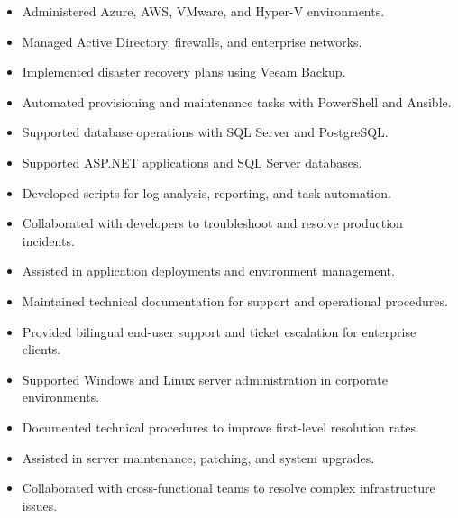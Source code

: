 \documentclass[10pt,a4paper,withhyper]{altacv}
\begin{document}
\divider

\begin{itemize}
  \item Administered Azure, AWS, VMware, and Hyper-V environments.
  \item Managed Active Directory, firewalls, and enterprise networks.
  \item Implemented disaster recovery plans using Veeam Backup.
  \item Automated provisioning and maintenance tasks with PowerShell and Ansible.
  \item Supported database operations with SQL Server and PostgreSQL.
\end{itemize}

\divider

\newpage

\begin{itemize}
  \item Supported ASP.NET applications and SQL Server databases.
  \item Developed scripts for log analysis, reporting, and task automation.
  \item Collaborated with developers to troubleshoot and resolve production incidents.
  \item Assisted in application deployments and environment management.
  \item Maintained technical documentation for support and operational procedures.
\end{itemize}

\divider

\begin{itemize}
  \item Provided bilingual end-user support and ticket escalation for enterprise clients.
  \item Supported Windows and Linux server administration in corporate environments.
  \item Documented technical procedures to improve first-level resolution rates.
  \item Assisted in server maintenance, patching, and system upgrades.
  \item Collaborated with cross-functional teams to resolve complex infrastructure issues.
\end{itemize}
\end{document}
